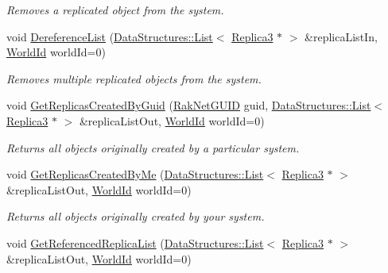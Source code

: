 \begin{DoxyCompactItemize}
\begin{DoxyCompactList}\small\item\em Removes a replicated object from the system. \end{DoxyCompactList}\item 
void \hyperlink{class_rak_net_1_1_replica_manager3_a5426d3a746720ee8a8d9f1e1961f4a60}{Dereference\-List} (\hyperlink{class_data_structures_1_1_list}{Data\-Structures\-::\-List}$<$ \hyperlink{class_rak_net_1_1_replica3}{Replica3} $\ast$ $>$ \&replica\-List\-In, \hyperlink{group___r_e_p_l_i_c_a___m_a_n_a_g_e_r___g_r_o_u_p3_ga44b59af8e882248f61aa41d8ace38bf7}{World\-Id} world\-Id=0)
\begin{DoxyCompactList}\small\item\em Removes multiple replicated objects from the system. \end{DoxyCompactList}\item 
void \hyperlink{class_rak_net_1_1_replica_manager3_adeb8596077be0f06f808ca475942bda1}{Get\-Replicas\-Created\-By\-Guid} (\hyperlink{struct_rak_net_1_1_rak_net_g_u_i_d}{Rak\-Net\-G\-U\-I\-D} guid, \hyperlink{class_data_structures_1_1_list}{Data\-Structures\-::\-List}$<$ \hyperlink{class_rak_net_1_1_replica3}{Replica3} $\ast$ $>$ \&replica\-List\-Out, \hyperlink{group___r_e_p_l_i_c_a___m_a_n_a_g_e_r___g_r_o_u_p3_ga44b59af8e882248f61aa41d8ace38bf7}{World\-Id} world\-Id=0)
\begin{DoxyCompactList}\small\item\em Returns all objects originally created by a particular system. \end{DoxyCompactList}\item 
void \hyperlink{class_rak_net_1_1_replica_manager3_af134995196f488ab2d6488c1e0dd0fa9}{Get\-Replicas\-Created\-By\-Me} (\hyperlink{class_data_structures_1_1_list}{Data\-Structures\-::\-List}$<$ \hyperlink{class_rak_net_1_1_replica3}{Replica3} $\ast$ $>$ \&replica\-List\-Out, \hyperlink{group___r_e_p_l_i_c_a___m_a_n_a_g_e_r___g_r_o_u_p3_ga44b59af8e882248f61aa41d8ace38bf7}{World\-Id} world\-Id=0)
\begin{DoxyCompactList}\small\item\em Returns all objects originally created by your system. \end{DoxyCompactList}\item 
void \hyperlink{class_rak_net_1_1_replica_manager3_a30065a01eec701daed0a4310834286ba}{Get\-Referenced\-Replica\-List} (\hyperlink{class_data_structures_1_1_list}{Data\-Structures\-::\-List}$<$ \hyperlink{class_rak_net_1_1_replica3}{Replica3} $\ast$ $>$ \&replica\-List\-Out, \hyperlink{group___r_e_p_l_i_c_a___m_a_n_a_g_e_r___g_r_o_u_p3_ga44b59af8e882248f61aa41d8ace38bf7}{World\-Id} world\-Id=0)

\end{DoxyCompactItemize}
